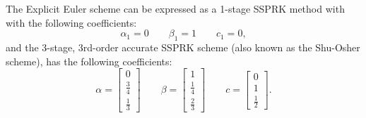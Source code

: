 The Explicit Euler scheme can be expressed as a 1-stage SSPRK method with
with the following coefficients:
\begin{equation}
   \alpha_1 = 0\qquad\beta_1 = 1\qquad c_1 = 0,
\end{equation}
and the 3-stage, 3rd-order accurate SSPRK scheme (also known as the Shu-Osher
scheme), has the following coefficients:
\begin{equation}
   \alpha = \left[\begin{array}{c}0\\\frac{3}{4}\\\frac{1}{3}\end{array}\right]
   \qquad\beta = \left[\begin{array}{c}1\\\frac{1}{4}\\\frac{2}{3}\end{array}\right]
   \qquad c = \left[\begin{array}{c}0\\1\\\frac{1}{2}\end{array}\right].
\end{equation}

